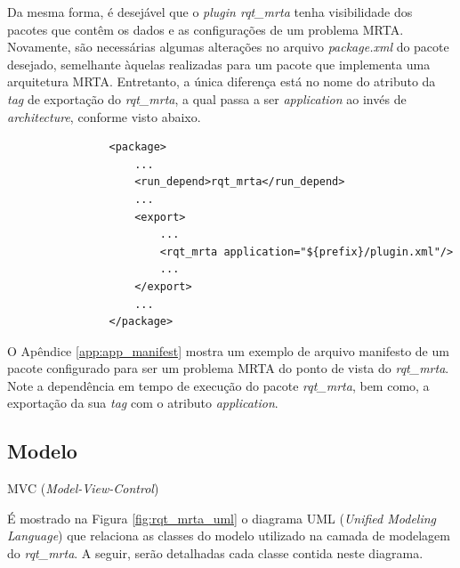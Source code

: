             Da mesma forma, é desejável que o \textit{plugin rqt\_mrta} tenha visibilidade dos pacotes que contêm os dados e as configurações de um problema MRTA. Novamente, são necessárias algumas alterações no arquivo \textit{package.xml} do pacote desejado, semelhante àquelas realizadas para um pacote que implementa uma arquitetura MRTA. Entretanto, a única diferença está no nome do atributo da \textit{tag} de exportação do \textit{rqt\_mrta}, a qual passa a ser \textit{application} ao invés de \textit{architecture}, conforme visto abaixo.
            
            \begin{lstlisting}
                <package>
                    ...
                    <run_depend>rqt_mrta</run_depend>
                    ...
                    <export>
                        ...
                        <rqt_mrta application="${prefix}/plugin.xml"/>
                        ...
                    </export>
                    ...
                </package>
            \end{lstlisting}
            
            O Apêndice \ref{app:app_manifest} mostra um exemplo de arquivo manifesto de um pacote configurado para ser um problema MRTA do ponto de vista do \textit{rqt\_mrta}. Note a dependência em tempo de execução do pacote \textit{rqt\_mrta}, bem como, a exportação da sua \textit{tag} com o atributo \textit{application}.
            
        
        \subsection{Modelo}  \label{subset:model}
        
            MVC (\textit{Model-View-Control})
            
            É mostrado na Figura \ref{fig:rqt_mrta_uml} o diagrama UML (\textit{Unified Modeling Language}) que relaciona as classes do modelo utilizado na camada de modelagem do \textit{rqt\_mrta}. A seguir, serão detalhadas cada classe contida neste diagrama.
            
